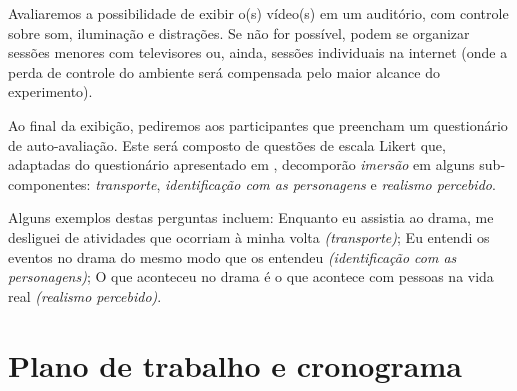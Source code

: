 \documentclass[a4paper]{tufte-handout}
\newcommand{\textls}[2][5]{%
    \begingroup\addfontfeatures{LetterSpace=#1}#2\endgroup
  }
\renewcommand{\smallcapsspacing}[1]{\textls[10]{#1}}
\renewcommand{\textsc}[1]{\smallcapsspacing{\textsmallcaps{#1}}}
\begin{document}
Avaliaremos a possibilidade de exibir o(s) vídeo(s) em um auditório, com controle sobre som, iluminação e distrações. Se não for possível, podem se organizar sessões menores com televisores ou, ainda, sessões individuais na internet (onde a perda de controle do ambiente será compensada pelo maior alcance do experimento).

Ao final da exibição, pediremos aos participantes que preencham um questionário de auto-avaliação. Este será composto de questões de escala Likert que, adaptadas do questionário apresentado em \citet{Kruger2016}, decomporão \textit{imersão} em alguns sub-componentes: \textit{transporte}, \textit{identificação com as personagens} e \textit{realismo percebido}.

Alguns exemplos destas perguntas incluem: Enquanto eu assistia ao drama, me desliguei de atividades que ocorriam à minha volta \textit{(transporte)}; Eu entendi os eventos no drama do mesmo modo que \textsc{xxx} os entendeu \textit{(identificação com as personagens)}; O que aconteceu no drama é o que acontece com pessoas na vida real \textit{(realismo percebido)}.



\pagebreak

\section{Plano de trabalho e cronograma}\label{sec:plano_de_trabalho}
\end{document}
